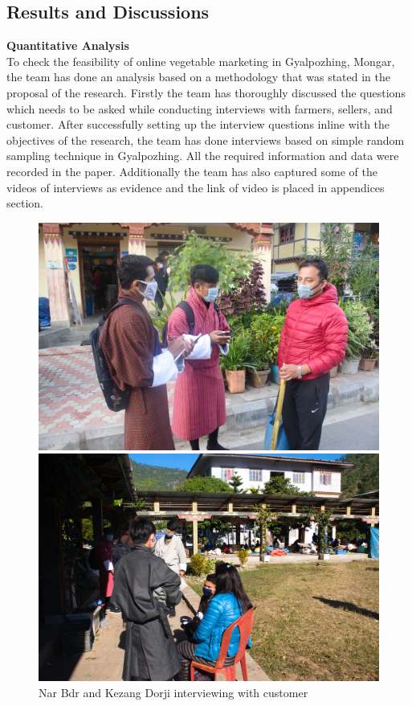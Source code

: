 \documentclass[12pt]{report}
\begin{document}
\begin{normalsize}

\section{Results and Discussions}

{\bfseries Quantitative Analysis }\newline\\[0.1cm]
To check the feasibility of online vegetable marketing in Gyalpozhing, Mongar, the team has done an analysis based on a methodology that was stated in the proposal of the research. Firstly the team has thoroughly discussed the questions which needs to be asked while conducting interviews with farmers, sellers, and customer. After successfully setting up the interview questions inline with the objectives of the research, the  team has done interviews based on  simple random sampling technique in Gyalpozhing. All the required information and data were recorded in the paper. Additionally the team has also captured some of the videos of interviews as evidence and the link of video is placed in appendices section.\newline\\[0.1cm]
\begin{figure}[!htb]
   \begin{minipage}{0.48\textwidth}
     \centering
     \includegraphics[width=.7\linewidth]{1-min.jpg}
     \caption{Nar Bdr and Kezang Dorji \newline interviewing with customer}\label{Fig:Data1}
   \end{minipage}\hfill
   \begin{minipage}{0.48\textwidth}
     \centering
     \includegraphics[width=.7\linewidth]{2-min.jpg}

\end{minipage}
\end{figure}
\end{normalsize}
\end{document}
